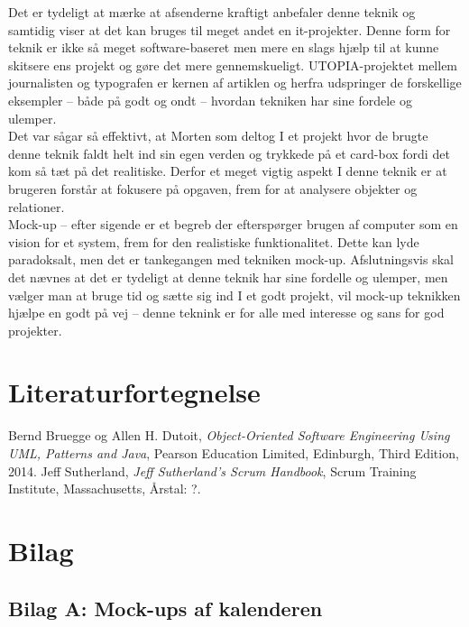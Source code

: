 \documentclass[12pt]{article}   %
\begin{document}
\noindent Det er tydeligt at mærke at afsenderne kraftigt anbefaler denne teknik og samtidig viser at det kan bruges til meget andet en it-projekter. Denne form for teknik er ikke så meget software-baseret men mere en slags hjælp til at kunne skitsere ens projekt og gøre det mere gennemskueligt. UTOPIA-projektet mellem journalisten og typografen er kernen af artiklen og herfra udspringer de forskellige eksempler – både på godt og ondt – hvordan tekniken har sine fordele og ulemper. \\
Det var sågar så effektivt, at Morten som deltog I et projekt hvor de brugte denne teknik faldt helt ind sin egen verden og trykkede på et card-box fordi det kom så tæt på det realitiske.  Derfor et meget vigtig aspekt I denne teknik er at brugeren forstår at fokusere på opgaven, frem for at analysere objekter og relationer. \\
Mock-up – efter sigende er et begreb der efterspørger brugen af computer  som en vision for et system, frem for den realistiske funktionalitet. Dette kan lyde paradoksalt, men det er tankegangen med tekniken mock-up.  Afslutningsvis  skal det nævnes at det er tydeligt at denne teknik har sine fordelle og ulemper, men vælger man at bruge tid og sætte sig ind I et godt projekt, vil mock-up teknikken hjælpe en godt på vej – denne teknink er for alle med interesse og sans for god projekter. 



\pagebreak

\section{Literaturfortegnelse}
\begin{thebibliography}{9}
		Bernd Bruegge og Allen H. Dutoit,
		\emph{Object-Oriented Software Engineering Using UML, Patterns
		and Java},
		Pearson Education Limited, Edinburgh,
		Third Edition,
		2014.
		Jeff Sutherland,
		\emph{Jeff Sutherland's Scrum Handbook},
		Scrum Training Institute, Massachusetts,
		Årstal: ?.


\end{thebibliography}

\newpage

\section{Bilag}

\subsection{Bilag A: Mock-ups af kalenderen}
\end{document}
